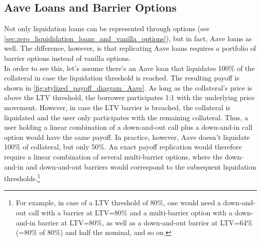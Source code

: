 \documentclass[a4paper]{article}
\begin{document}
\subsection{Aave Loans and Barrier Options}
\label{sec:aave_loans_and_barrier_options}
Not only liquidation loans can be represented through options (see \cref{sec:zero_liquididation_loans_and_vanilla_options}), but in fact, Aave loans as well. The difference, however, is that replicating Aave loans requires a portfolio of barrier options instead of vanilla options.\\

In order to see this, let's assume there's an Aave loan that liquidates 100\% of the collateral in case the liquidation threshold is reached. The resulting payoff is shown in \cref{fig:stylized_payoff_diagram_Aave}. As long as the collateral's price is above the LTV threshold, the borrower participates 1:1 with the underlying price movement. However, in case the LTV barrier is breached, the collateral is liquidated and the user only participates with the remaining collateral. Thus, a user holding a linear combination of a down-and-out call plus a down-and-in call option would have the same payoff. In practice, however, Aave doesn't liquidate 100\% of collateral, but only 50\%. An exact payoff replication would therefore require a linear combination of several multi-barrier options, where the down-and-in and down-and-out barriers would correspond to the subsequent liquidation thresholds.\footnote{For example, in case of a LTV threshold of 80\%, one would need a down-and-out call with a barrier at LTV=80\% and a multi-barrier option with a down-and-in barrier at LTV=80\%, as well as a down-and-out barrier at LTV=64\% (=80\% of 80\%) and half the nominal, and so on.}
\end{document}
